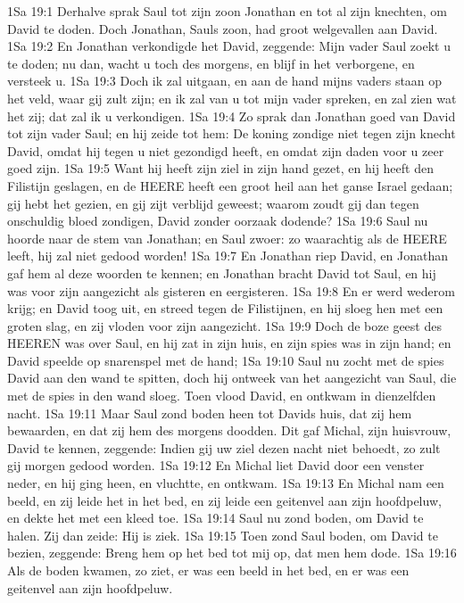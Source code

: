 1Sa 19:1  Derhalve sprak Saul tot zijn zoon Jonathan en tot al zijn knechten, om David te doden. Doch Jonathan, Sauls zoon, had groot welgevallen aan David.
1Sa 19:2  En Jonathan verkondigde het David, zeggende: Mijn vader Saul zoekt u te doden; nu dan, wacht u toch des morgens, en blijf in het verborgene, en versteek u.
1Sa 19:3  Doch ik zal uitgaan, en aan de hand mijns vaders staan op het veld, waar gij zult zijn; en ik zal van u tot mijn vader spreken, en zal zien wat het zij; dat zal ik u verkondigen.
1Sa 19:4  Zo sprak dan Jonathan goed van David tot zijn vader Saul; en hij zeide tot hem: De koning zondige niet tegen zijn knecht David, omdat hij tegen u niet gezondigd heeft, en omdat zijn daden voor u zeer goed zijn.
1Sa 19:5  Want hij heeft zijn ziel in zijn hand gezet, en hij heeft den Filistijn geslagen, en de HEERE heeft een groot heil aan het ganse Israel gedaan; gij hebt het gezien, en gij zijt verblijd geweest; waarom zoudt gij dan tegen onschuldig bloed zondigen, David zonder oorzaak dodende?
1Sa 19:6  Saul nu hoorde naar de stem van Jonathan; en Saul zwoer: zo waarachtig als de HEERE leeft, hij zal niet gedood worden!
1Sa 19:7  En Jonathan riep David, en Jonathan gaf hem al deze woorden te kennen; en Jonathan bracht David tot Saul, en hij was voor zijn aangezicht als gisteren en eergisteren.
1Sa 19:8  En er werd wederom krijg; en David toog uit, en streed tegen de Filistijnen, en hij sloeg hen met een groten slag, en zij vloden voor zijn aangezicht.
1Sa 19:9  Doch de boze geest des HEEREN was over Saul, en hij zat in zijn huis, en zijn spies was in zijn hand; en David speelde op snarenspel met de hand;
1Sa 19:10  Saul nu zocht met de spies David aan den wand te spitten, doch hij ontweek van het aangezicht van Saul, die met de spies in den wand sloeg. Toen vlood David, en ontkwam in dienzelfden nacht.
1Sa 19:11  Maar Saul zond boden heen tot Davids huis, dat zij hem bewaarden, en dat zij hem des morgens doodden. Dit gaf Michal, zijn huisvrouw, David te kennen, zeggende: Indien gij uw ziel dezen nacht niet behoedt, zo zult gij morgen gedood worden.
1Sa 19:12  En Michal liet David door een venster neder, en hij ging heen, en vluchtte, en ontkwam.
1Sa 19:13  En Michal nam een beeld, en zij leide het in het bed, en zij leide een geitenvel aan zijn hoofdpeluw, en dekte het met een kleed toe.
1Sa 19:14  Saul nu zond boden, om David te halen. Zij dan zeide: Hij is ziek.
1Sa 19:15  Toen zond Saul boden, om David te bezien, zeggende: Breng hem op het bed tot mij op, dat men hem dode.
1Sa 19:16  Als de boden kwamen, zo ziet, er was een beeld in het bed, en er was een geitenvel aan zijn hoofdpeluw.

